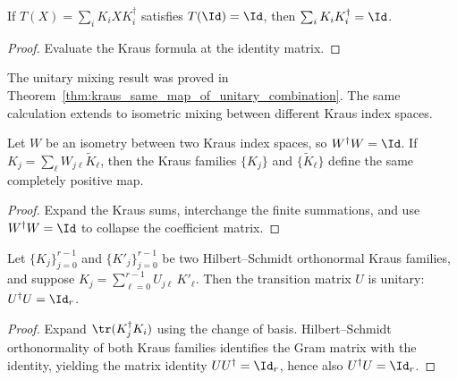 \begin{theorem}
    \label{thm:kraus_sum_mul_conjTranspose_of_unital}
    \leanok
    If $T(X) = \sum_i K_i X K_i^\dagger$ satisfies $T(\Id) = \Id$, then
    $\sum_i K_i K_i^\dagger = \Id$.
\end{theorem}

\begin{proof}\leanok
    Evaluate the Kraus formula at the identity matrix.
\end{proof}

The unitary mixing result was proved in
Theorem~\ref{thm:kraus_same_map_of_unitary_combination}. The same calculation
extends to isometric mixing between different Kraus index spaces.

\begin{theorem}
    \label{thm:kraus_same_map_of_isometry_combination}
    \leanok
    Let $W$ be an isometry between two Kraus index spaces, so $W^\dagger W = \Id$.
    If $K_j = \sum_\ell W_{j\ell} \widetilde K_\ell$, then the Kraus
    families $\{K_j\}$ and $\{\widetilde K_\ell\}$ define the same completely
    positive map.
\end{theorem}

\begin{proof}\leanok
    Expand the Kraus sums, interchange the finite summations, and use
    $W^\dagger W = \Id$ to collapse the coefficient matrix.
\end{proof}

\begin{theorem}\label{thm:kraus_transition_unitary_of_hs_orthonormal}
    \leanok
    Let $\{K_j\}_{j=0}^{r-1}$ and $\{K'_j\}_{j=0}^{r-1}$ be two
    Hilbert--Schmidt orthonormal Kraus families, and suppose
    $K_j = \sum_{\ell=0}^{r-1} U_{j\ell}\,K'_\ell$.
    Then the transition matrix $U$ is unitary:
    $U^\dagger U = \Id_r$.
\end{theorem}

\begin{proof}
    \leanok
    Expand $\tr(K_j^\dagger K_i)$ using the change of basis.
    Hilbert--Schmidt orthonormality of both Kraus families identifies
    the Gram matrix with the identity, yielding the matrix identity
    $U U^\dagger = \Id_r$, hence also $U^\dagger U = \Id_r$.
\end{proof}


